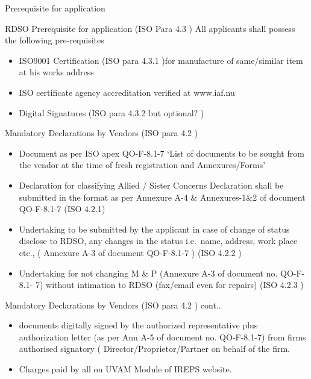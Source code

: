 \documentclass[
  10pt,
  ignorenonframetext,
  aspectratio=43,
]{beamer}
\providecommand{\tightlist}{%
  \setlength{\itemsep}{0pt}\setlength{\parskip}{0pt}}
\begin{document}
\begin{frame}{Prerequisite for application}
\protect\hypertarget{prerequisite-for-application}{}
\begin{block}{RDSO Prerequisite for application (ISO Para 4.3 )}
\protect\hypertarget{rdso-prerequisite-for-application-iso-para-4.3}{}
All applicants shall possess the following pre-requisites

\begin{itemize}
\tightlist
\item
  ISO9001 Certification (ISO para 4.3.1 )for manufacture of same/similar
  item at his works address
\item
  ISO certificate agency accreditation verified at www.iaf.nu
\item
  Digital Signatures (ISO para 4.3.2 but optional? )
\end{itemize}
\end{block}
\end{frame}

\begin{frame}{Mandatory Declarations by Vendors (ISO para 4.2 )}
\protect\hypertarget{mandatory-declarations-by-vendors-iso-para-4.2}{}
\begin{itemize}
\item
  Document as per ISO apex QO-F-8.1-7 `List of documents to be sought
  from the vendor at the time of fresh registration and Annexures/Forms'
\item
  Declaration for classifying Allied / Sister Concerns Declaration shall
  be submitted in the format as per Annexure A-4 \& Annexures-1\&2 of
  document QO-F-8.1-7 (ISO 4.2.1)
\item
  Undertaking to be submitted by the applicant in case of change of
  status disclose to RDSO, any changes in the status i.e.~name, address,
  work place etc., ( Annexure A-3 of document QO-F-8.1-7 ) (ISO 4.2.2 )
\item
  Undertaking for not changing M \& P (Annexure A-3 of document no.
  QO-F-8.1- 7) without intimation to RDSO (fax/email even for repairs)
  (ISO 4.2.3 )
\end{itemize}
\end{frame}

\begin{frame}{Mandatory Declarations by Vendors (ISO para 4.2 ) cont..}
\protect\hypertarget{mandatory-declarations-by-vendors-iso-para-4.2-cont..}{}
\begin{itemize}
\item
  documents digitally signed by the authorized representative plus
  authorization letter (as per Ann A-5 of document no. QO-F-8.1-7) from
  firms authorised signatory ( Director/Proprietor/Partner on behalf of
  the firm.
\item
  Charges paid by all on UVAM Module of IREPS website.
\end{itemize}
\end{frame}
\end{document}
